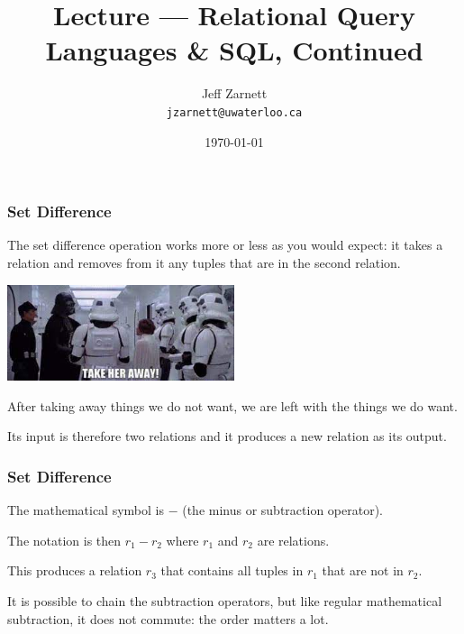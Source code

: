 

\title{Lecture --- Relational Query Languages \& SQL, Continued}

\author{Jeff Zarnett \\ \small \texttt{jzarnett@uwaterloo.ca}}
\date{\today}




\begin{frame}
  \titlepage

 \end{frame}



\begin{frame}
\frametitle{Set Difference}

The \alert{set difference} operation works more or less as you would expect: it takes a relation and removes from it any tuples that are in the second relation. 

\begin{center}
	\includegraphics[width=0.5\textwidth]{images/takeheraway.jpg}
\end{center}

After taking away things we do not want, we are left with the things we do want. 

Its input is therefore two relations and it produces a new relation as its output.


\end{frame}



\begin{frame}
\frametitle{Set Difference}

The mathematical symbol is $-$ (the minus or subtraction operator). 

The notation is then $r_{1} - r_{2}$ where $r_{1}$ and $r_{2}$ are relations.

 This produces a relation $r_{3}$ that contains all tuples in $r_{1}$ that are not in $r_{2}$. 
 
 It is possible to chain the subtraction operators, but like regular mathematical subtraction, it does not commute: the order matters a lot. 


\end{frame}




